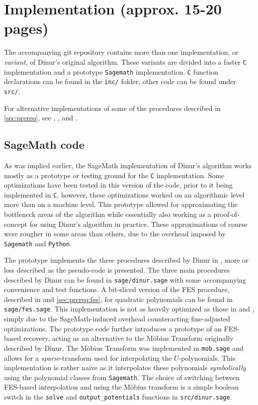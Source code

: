 \section{Implementation (approx. 15-20 pages)} \label{sec:impl}
The accompanying git repository contains more than one implementation, or \textit{variant}, of Dinur's original algorithm. These variants are divided into a faster \texttt{C} implementation and a prototype \texttt{Sagemath} implementation. \texttt{C} function declarations can be found in the \texttt{inc/} folder, other code can be found under \texttt{src/}.

For alternative implementations of some of the procedures described in \cref{sec:prereq}, see \cite{cryptoeprint:2010/313}, \cite{cryptoeprint:2013/436}, and \cite{cryptoeprint:2022/214}.

\subsection{SageMath code}
As was implied earlier, the SageMath implementation of Dinur's algorithm works mostly as a prototype or testing ground for the \texttt{C} implementation. Some optimizations have been tested in this version of the code, prior to it being implemented in \texttt{C}, however, these optimizations worked on an algorithmic level more than on a machine level. This prototype allowed for approximating the bottleneck areas of the algorithm while essentially also working as a proof-of-concept for using Dinur's algorithm in practice. These approximations of course were rougher in some areas than others, due to the overhead imposed by \texttt{Sagemath} and \texttt{Python}.

The prototype implements the three procedures described by Dinur in \cite{cryptoeprint:2021/578}, more or less described as the pseudo-code is presented. The three main procedures described by Dinur can be found in \texttt{sage/dinur.sage} with some accompanying convenience and test functions. A bit-sliced version of the FES procedure, described in \cite{cryptoeprint:2010/313} and \cref{sec:prereq:fes}, for quadratic polynomials can be found in \texttt{sage/fes.sage}. This implementation is not as heavily optimized as those in \cite{cryptoeprint:2010/313} and \cite{cryptoeprint:2013/436}, simply due to the SageMath-induced overhead counteracting fine-adjusted optimizations. The prototype code further introduces a prototype of an FES-based recovery, acting as an alternative to the Möbius Transform originally described by Dinur. The Möbius Transform was implemented in \texttt{mob.sage} and allows for a \textit{sparse}-transform used for interpolating the $U$-polynomials. This implementation is rather naive as it interpolates these polynomials \textit{symbolically} using the polynomial classes from \texttt{Sagemath}. The choice of switching between FES-based interpolation and using the Möbius transform is a simple boolean switch in the \texttt{solve} and \texttt{output\_potentials} functions in \texttt{src/dinur.sage}.  

